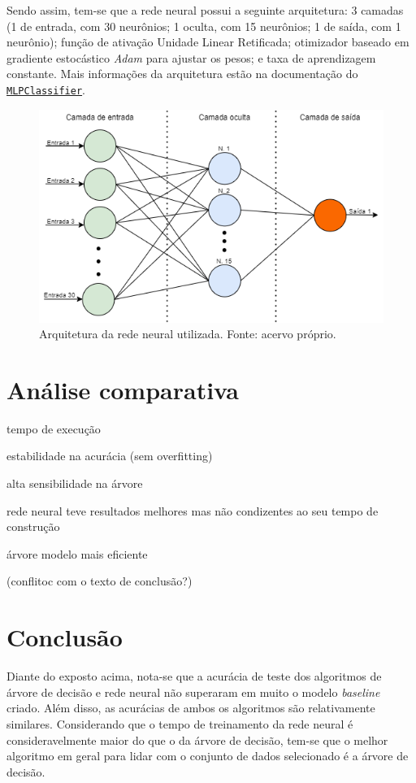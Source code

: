 \documentclass[12pt]{article}
\begin{document}
Sendo assim, tem-se que a rede neural possui a seguinte arquitetura: 3 camadas (1 de entrada, com 30 neurônios; 1 oculta, com 15 neurônios; 1 de saída, com 1 neurônio); função de ativação Unidade Linear Retificada; otimizador baseado em gradiente estocástico \textit{Adam} para ajustar os pesos; e taxa de aprendizagem constante. Mais informações da arquitetura estão na documentação do \href{https://scikit-learn.org/stable/modules/generated sklearn.neural_network.MLPClassifier.html}{\texttt{MLPClassifier}}.

\begin{figure}[t!]
    \includegraphics[width=\linewidth]{figures/ann}
    \caption{Arquitetura da rede neural utilizada. Fonte: acervo próprio.}
    \label{fig:ann}
\end{figure}

\section{Análise comparativa}\label{sec:analise}

tempo de execução

estabilidade na acurácia (sem overfitting)

alta sensibilidade na árvore

rede neural teve resultados melhores mas não condizentes ao seu tempo de construção

árvore modelo mais eficiente

(conflitoc com o texto de conclusão?)

\section{Conclusão}\label{sec:conclusao}
Diante do exposto acima, nota-se que a acurácia de teste dos algoritmos de árvore de decisão e rede neural não superaram em muito o modelo \textit{baseline} criado. Além disso, as acurácias de ambos os algoritmos são relativamente similares.  Considerando que o tempo de treinamento da rede neural é consideravelmente maior do que o da árvore de decisão, tem-se que o melhor algoritmo em geral para lidar com o conjunto de dados selecionado é a árvore de decisão. 
\end{document}
